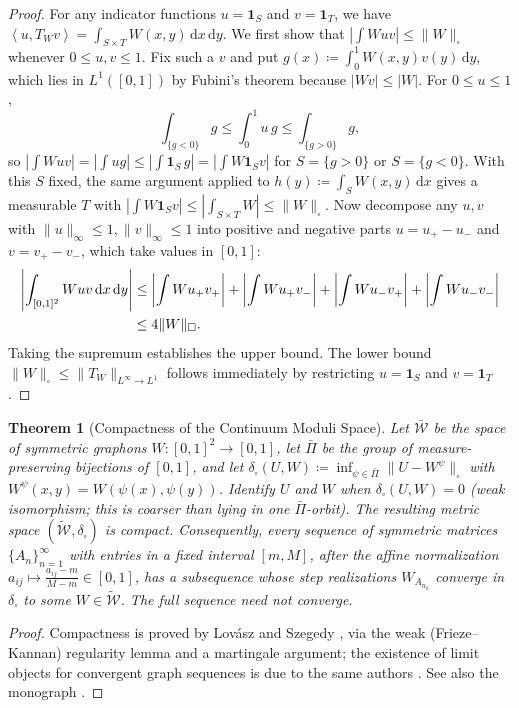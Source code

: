 \documentclass[11pt,a4paper,reqno]{amsart}
\newtheorem{theorem}{Theorem}[section]
\theoremstyle{definition}
\numberwithin{equation}{section}
\providecommand{\cutnorm}[1]{\|#1\|_{\square}}
\newcommand{\inner}[2]{\left\langle #1, #2 \right\rangle}
\newcommand{\dif}{\,\mathrm{d}}
\begin{document}
\begin{proof}
For any indicator functions $u = \mathbf{1}_S$ and $v = \mathbf{1}_T$, we have $\inner{u}{T_W v} = \int_{S \times T} W(x,y) \dif x \dif y$. We first show that $\left|\int W u v\right| \le \cutnorm{W}$ whenever $0 \le u, v \le 1$. Fix such a $v$ and put $g(x) \coloneqq \int_0^1 W(x,y) v(y) \dif y$, which lies in $L^1([0,1])$ by Fubini's theorem because $|Wv| \le |W|$. For $0 \le u \le 1$,
\begin{equation*}
    \int_{\{g<0\}} g \le \int_0^1 u\, g \le \int_{\{g>0\}} g,
\end{equation*}
so $\left|\int W u v\right| = \left|\int u g\right| \le \left|\int \mathbf{1}_S\, g\right| = \left|\int W \mathbf{1}_S v\right|$ for $S = \{g>0\}$ or $S = \{g<0\}$. With this $S$ fixed, the same argument applied to $h(y) \coloneqq \int_S W(x,y) \dif x$ gives a measurable $T$ with $\left|\int W \mathbf{1}_S v\right| \le \left|\int_{S \times T} W\right| \le \cutnorm{W}$. Now decompose any $u, v$ with $\|u\|_\infty \le 1, \|v\|_\infty \le 1$ into positive and negative parts $u = u_+ - u_-$ and $v = v_+ - v_-$, which take values in $[0,1]$:
\begin{align}
    \left|\int_{[0,1]^2} W u v \dif x \dif y\right| 
    &\le \left|\int W u_+ v_+\right| + \left|\int W u_+ v_-\right| + \left|\int W u_- v_+\right| + \left|\int W u_- v_-\right| \notag \\
    &\le 4 \cutnorm{W}.
\end{align}
Taking the supremum establishes the upper bound. The lower bound $\cutnorm{W} \le \|T_W\|_{L^\infty \to L^1}$ follows immediately by restricting $u = \mathbf{1}_S$ and $v = \mathbf{1}_T$.
\end{proof}

\begin{theorem}[Compactness of the Continuum Moduli Space]
\label{thm:graphon_compactness}
Let $\bar{\mathcal{W}}$ be the space of symmetric graphons $W \colon [0, 1]^2 \to [0, 1]$, let $\bar{\Pi}$ be the group of measure-preserving bijections of $[0,1]$, and let $\delta_\square(U, W) \coloneqq \inf_{\psi \in \bar\Pi} \cutnorm{U - W^\psi}$ with $W^\psi(x,y) = W(\psi(x),\psi(y))$. Identify $U$ and $W$ when $\delta_\square(U, W) = 0$ (weak isomorphism; this is coarser than lying in one $\bar\Pi$-orbit). The resulting metric space $(\widetilde{\mathcal{W}}, \delta_\square)$ is \emph{compact}. Consequently, every sequence of symmetric matrices $\{A_n\}_{n=1}^\infty$ with entries in a fixed interval $[m, M]$, after the affine normalization $a_{ij} \mapsto \frac{a_{ij} - m}{M - m} \in [0, 1]$, has a subsequence whose step realizations $W_{A_{n_k}}$ converge in $\delta_\square$ to some $W \in \widetilde{\mathcal{W}}$. The full sequence need not converge.
\end{theorem}
\begin{proof}
Compactness is proved by Lov\'asz and Szegedy \cite{lovasz2007szemeredi}, via the weak (Frieze--Kannan) regularity lemma and a martingale argument; the existence of limit objects for convergent graph sequences is due to the same authors \cite{lovasz2006limits}. See also the monograph \cite{lovasz2012large}.
\end{proof}
\end{document}
